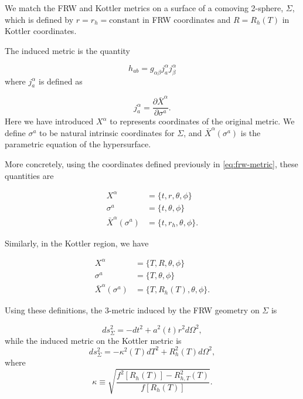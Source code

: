 We match the FRW and Kottler metrics on a surface of a comoving 2-sphere, $\Sigma$, which is defined by $r = r_h = \text{constant}$ in FRW coordinates and $R = R_h(T)$ in Kottler coordinates.

The induced metric is the quantity 

\begin{equation}
  h_{ab} = g_{\alpha \beta} j^{\alpha}_{a} j^{\alpha}_{\beta}
  \label{eq:induced-metric-defn}
\end{equation}
where $j^{\alpha}_{a}$ is defined as

\begin{equation}
  j^{\alpha}_{a} = \frac{\partial \bar{X}^{\alpha}}{\partial \sigma^a}.
  \label{eq:j-defn}
\end{equation}
Here we have introduced $X^{\alpha}$ to represents coordinates of the original metric. We define $\sigma^a$ to be natural intrinsic coordinates for $\Sigma$, and $\bar{X}^{\alpha}(\sigma^a)$ is the parametric equation of the hypersurface. 

More concretely, using the coordinates defined previously in \autoref{eq:frw-metric}, these quantities are

\begin{subequations}
  \begin{align}
    X^{\alpha} &= \{ t, r, \theta, \phi \} \\
    \sigma^a &= \{ t, \theta, \phi \} \\
    \bar{X}^{\alpha}(\sigma^a) &= \{ t, r_h, \theta, \phi\}.
  \end{align}
\end{subequations}

Similarly, in the Kottler region, we have 

\begin{subequations}
  \begin{align}
    X^{\alpha} &= \{ T, R, \theta, \phi \} \\
    \sigma^a &= \{ T, \theta, \phi \} \\
    \bar{X}^{\alpha}(\sigma^a) &= \{ T, R_h(T), \theta, \phi\}.
  \end{align}
\end{subequations}

Using these definitions, the 3-metric induced by the FRW geometry on $\Sigma$ is

\begin{equation}
  ds^2_{\Sigma} = -dt^2 + a^2(t)r^2 d \Omega^2,
  \label{eq:frw-induced-metric}
\end{equation}
while the induced metric on the Kottler metric is
\begin{equation}
  ds_{\Sigma}^2 = -\kappa^2(T)dT^2 + R_h^2(T) d \Omega^2,
  \label{eq:kottler-induced-metric}
\end{equation}
where
\begin{equation}
  \kappa \equiv \sqrt{\frac{f^2[R_h(T)] - R_{h,T}^2(T)}{f[R_h(T)]}}.
  \label{eq:kottler-kappa}
\end{equation}

